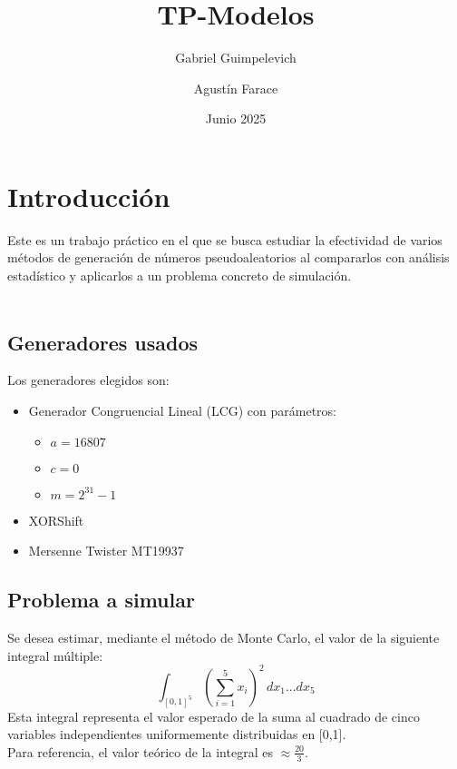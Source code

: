 \documentclass[12pt]{article}
\title{{TP-Modelos}}
\author{Gabriel Guimpelevich\and Agustín Farace}
\date{Junio 2025}
\begin{document}
\maketitle

\section{Introducción}
Este es un trabajo práctico en el que se busca estudiar la efectividad de varios métodos de generación de números pseudoaleatorios al compararlos con análisis estadístico y aplicarlos a un problema concreto de simulación.
\\\\
    \subsection{Generadores usados}
    Los generadores elegidos son:
    \begin{itemize}
        \item Generador Congruencial Lineal (LCG) con parámetros:
        \begin{itemize}[label=$\ast$]
            \item $a=16807$ 
            \item $c=0$ 
            \item $m=2^{31}-1$
        \end{itemize}
    
        \item XORShift
        \item Mersenne Twister MT19937
    \end{itemize}
    
\pagebreak
    \subsection{Problema a simular}
    Se desea estimar, mediante el método de Monte Carlo, el valor de la siguiente integral múltiple:
    \[
    \int_{[0,1]^5} \left( \sum_{i=1}^5 x_i \right)^2 \, dx_1...dx_5
    \]
    Esta integral representa el valor esperado de la suma al cuadrado de cinco variables independientes uniformemente distribuidas en [0,1].\\
    Para referencia, el valor teórico de la integral es $\approx \frac{20}{3}$.
\end{document}
